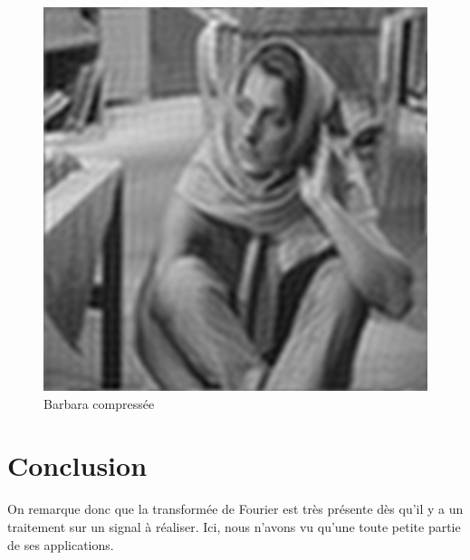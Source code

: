 \documentclass{article}
\begin{document}
\begin{figure}
	\begin{center}
		\includegraphics[scale=0.4]{barbara_compresse}\\
		Barbara compressée
	\end{center}
\end{figure}
\section{Conclusion}
On remarque donc que la transformée de Fourier est très présente dès qu'il y a un traitement sur un signal à réaliser. Ici, nous n'avons vu qu'une toute petite partie de ses applications.
\end{document}
